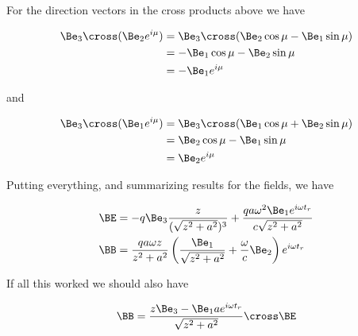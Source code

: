 
For the direction vectors in the cross products above we have

\begin{align*}
\Be_3 \cross (\Be_2 e^{i \mu})
&=
\Be_3 \cross (\Be_2 \cos\mu - \Be_1 \sin\mu) \\
&=
-\Be_1 \cos\mu - \Be_2 \sin\mu \\
&=
-\Be_1 e^{i \mu}
\end{align*}

and

\begin{align*}
\Be_3 \cross (\Be_1 e^{i \mu})
&=
\Be_3 \cross (\Be_1 \cos\mu + \Be_2 \sin\mu) \\
&=
\Be_2 \cos\mu - \Be_1 \sin\mu \\
&=
\Be_2 e^{i \mu}
\end{align*}

Putting everything, and summarizing results for the fields, we have

\begin{align}\label{eqn:relativisticElectrodynamicsExamReflection:n}
\BE &= 
-q \Be_3 \frac{z}{(\sqrt{z^2 + a^2})^3}
+
\frac{q a \omega^2 \Be_1 e^{i \omega t_r} }{c \sqrt{z^2 + a^2}} \\
\BB 
&= \frac{q a \omega z}{ z^2 + a^2} \left( \frac{\Be_1}{\sqrt{z^2 + a^2}} + \frac{\omega}{c} \Be_2 \right) e^{i \omega t_r}
\end{align}

If all this worked we should also have

\begin{equation}\label{eqn:relativisticElectrodynamicsExamReflection:n}
\BB = \frac{z \Be_3 - \Be_1 a e^{i \omega t_r}}{\sqrt{z^2 + a^2}} \cross \BE
\end{equation}

\EndNoBibArticle
